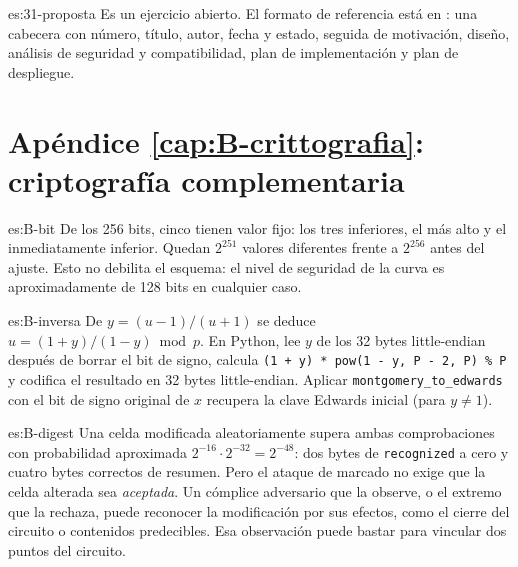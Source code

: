 \begin{soluzione}{es:31-proposta}
Es un ejercicio abierto. El formato de referencia está en : una cabecera con número, título, autor, fecha y estado, seguida de motivación, diseño, análisis de seguridad y compatibilidad, plan de implementación y plan de despliegue.
\end{soluzione}

\section*{Apéndice \ref{cap:B-crittografia}: criptografía complementaria}

\begin{soluzione}{es:B-bit}
De los 256 bits, cinco tienen valor fijo: los tres inferiores, el más alto y el inmediatamente inferior. Quedan $2^{251}$ valores diferentes frente a $2^{256}$ antes del ajuste. Esto no debilita el esquema: el nivel de seguridad de la curva es aproximadamente de 128 bits en cualquier caso.
\end{soluzione}

\begin{soluzione}{es:B-inversa}
De $y=(u-1)/(u+1)$ se deduce $u=(1+y)/(1-y)\bmod p$. En Python, lee $y$ de los 32 bytes little-endian después de borrar el bit de signo, calcula \texttt{(1 + y) * pow(1 - y, P - 2, P) \% P} y codifica el resultado en 32 bytes little-endian. Aplicar \texttt{montgomery\_to\_edwards} con el bit de signo original de $x$ recupera la clave Edwards inicial (para $y \neq 1$).
\end{soluzione}

\begin{soluzione}{es:B-digest}
Una celda modificada aleatoriamente supera ambas comprobaciones con probabilidad aproximada $2^{-16}\cdot2^{-32}=2^{-48}$: dos bytes de \texttt{recognized} a cero y cuatro bytes correctos de resumen. Pero el ataque de marcado no exige que la celda alterada sea \emph{aceptada}. Un cómplice adversario que la observe, o el extremo que la rechaza, puede reconocer la modificación por sus efectos, como el cierre del circuito o contenidos predecibles. Esa observación puede bastar para vincular dos puntos del circuito.
\end{soluzione}
